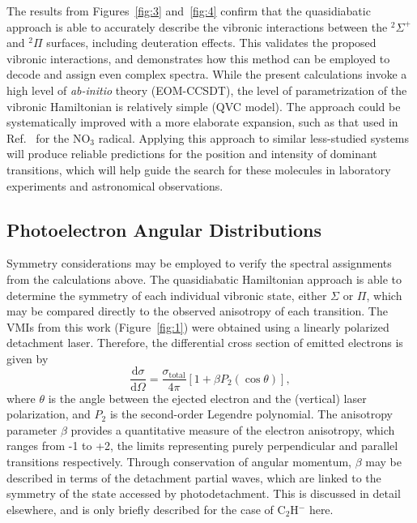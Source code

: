 \documentclass[journal=jpcafh,manuscript=article,layout=onecolumn, 12pt]{achemso}
\newcommand{\onlinecite}[1]{\hspace{-1 ex} \nocite{#1}\citenum{#1}}
\begin{document}
The results from Figures~\ref{fig:3} and~\ref{fig:4} confirm that the quasidiabatic approach is able to accurately describe the vibronic interactions between the $^2\Sigma^+$ and $^2\Pi$ surfaces, including deuteration effects. This validates the proposed vibronic interactions, and demonstrates how this method can be employed to decode and assign even complex spectra. While the present calculations invoke a high level of \emph{ab-initio} theory (EOM-CCSDT), the level of parametrization of the vibronic Hamiltonian is relatively simple (QVC model). The approach could be systematically improved with a more elaborate expansion, such as that used in Ref.~\onlinecite{sim12} for the NO$_3$ radical. Applying this approach to similar less-studied systems will produce reliable predictions for the position and intensity of dominant transitions, which will help guide the search for these molecules in laboratory experiments and astronomical observations. 




\subsection{Photoelectron Angular Distributions}
Symmetry considerations may be employed to verify the spectral assignments from the calculations above. The quasidiabatic Hamiltonian approach is able to determine the symmetry of each individual vibronic state, either $\Sigma$ or $\Pi$, which may be compared directly to the observed anisotropy of each transition. The VMIs from this work (Figure~\ref{fig:1}) were obtained using a linearly polarized detachment laser. Therefore, the differential cross section of emitted electrons is given by  
\begin{equation}
	\frac{\text{d}\sigma}{\text{d}\Omega}=\frac{\sigma_{\text{total}}}{4\pi}[1+\beta P_{2}(\cos\theta)],
	\label{eq:beta1}
\end{equation}
where $\theta$ is the angle between the ejected electron and the (vertical) 
laser polarization, and $P_2$ is the second-order Legendre polynomial. The anisotropy parameter $\beta$ provides a quantitative measure of the electron anisotropy, which ranges from -1 to +2, the limits representing purely perpendicular and parallel transitions respectively. Through conservation of angular momentum, $\beta$ may be described in terms of the detachment partial waves, which are linked to the symmetry of the state accessed by photodetachment. This is discussed in detail elsewhere\cite{khu14,law19}, and is only briefly described for the case of C$_2$H$^-$ here. 
\end{document}
